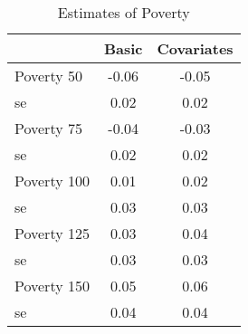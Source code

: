 \begin{table}[htbp]\centering
\caption{Estimates of Poverty}
\begin{tabular}{l*{2}{c}}
\toprule
            &       Basic&  Covariates\\
\midrule
Poverty 50  &       -0.06&       -0.05\\
se          &        0.02&        0.02\\
Poverty 75  &       -0.04&       -0.03\\
se          &        0.02&        0.02\\
Poverty 100 &        0.01&        0.02\\
se          &        0.03&        0.03\\
Poverty 125 &        0.03&        0.04\\
se          &        0.03&        0.03\\
Poverty 150 &        0.05&        0.06\\
se          &        0.04&        0.04\\
\bottomrule
\end{tabular}
\end{table}
